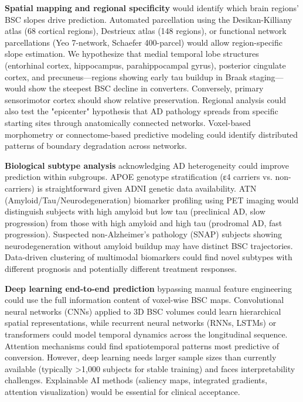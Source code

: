 \documentclass[blue]{ludusofficial}  %
\begin{document}
\textbf{Spatial mapping and regional specificity} would identify which brain regions' BSC slopes drive prediction. Automated parcellation using the Desikan-Killiany atlas (68 cortical regions), Destrieux atlas (148 regions), or functional network parcellations (Yeo 7-network, Schaefer 400-parcel) would allow region-specific slope estimation. We hypothesize that medial temporal lobe structures (entorhinal cortex, hippocampus, parahippocampal gyrus), posterior cingulate cortex, and precuneus—regions showing early tau buildup in Braak staging—would show the steepest BSC decline in converters. Conversely, primary sensorimotor cortex should show relative preservation. Regional analysis could also test the "epicenter" hypothesis that AD pathology spreads from specific starting sites through anatomically connected networks. Voxel-based morphometry or connectome-based predictive modeling could identify distributed patterns of boundary degradation across networks.

\textbf{Biological subtype analysis} acknowledging AD heterogeneity could improve prediction within subgroups. APOE genotype stratification (ε4 carriers vs. non-carriers) is straightforward given ADNI genetic data availability. ATN (Amyloid/Tau/Neurodegeneration) biomarker profiling using PET imaging would distinguish subjects with high amyloid but low tau (preclinical AD, slow progression) from those with high amyloid and high tau (prodromal AD, fast progression). Suspected non-Alzheimer's pathology (SNAP) subjects showing neurodegeneration without amyloid buildup may have distinct BSC trajectories. Data-driven clustering of multimodal biomarkers could find novel subtypes with different prognosis and potentially different treatment responses.

\textbf{Deep learning end-to-end prediction} bypassing manual feature engineering could use the full information content of voxel-wise BSC maps. Convolutional neural networks (CNNs) applied to 3D BSC volumes could learn hierarchical spatial representations, while recurrent neural networks (RNNs, LSTMs) or transformers could model temporal dynamics across the longitudinal sequence. Attention mechanisms could find spatiotemporal patterns most predictive of conversion. However, deep learning needs larger sample sizes than currently available (typically >1,000 subjects for stable training) and faces interpretability challenges. Explainable AI methods (saliency maps, integrated gradients, attention visualization) would be essential for clinical acceptance.
\end{document}
